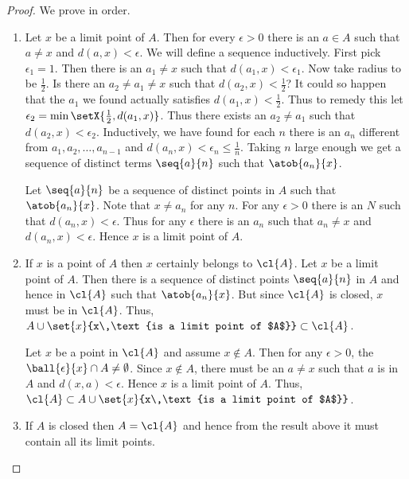 \begin{proof}
    We prove in order.
    \begin{enumerate}
	\item
	    Let $x$ be a limit point of $A$. Then for every $\epsilon > 0$ there is an $a \in A$ such that
	    $a \neq x$ and $d(a,x) < \epsilon$. We will define a sequence inductively.
	    First pick $\epsilon_1 = 1$. Then there is an $a_1 \neq x$ such that $d(a_1,x) < \epsilon_1$. Now
	    take radius to be $\frac{1}{2}$. Is there an $a_2 \neq a_1 \neq x$ such that $d(a_2,x) <
	    \frac{1}{2}$? It could so happen that the $a_1$ we found actually satisfies $d(a_1,x) <
	    \frac{1}{2}$. Thus to remedy this let $\epsilon_2 = \min\setX{\frac{1}{2},d(a_1,x)}$. Thus there
	    exists an $a_2 \neq a_1$ such that $d(a_2,x) < \epsilon_2$. Inductively, we have found for each
	    $n$ there is an $a_n$ different from $a_1,a_2,\ldots,a_{n-1}$ and $d(a_n,x) < \epsilon_n \leq
	    \frac{1}{n}$. Taking $n$ large enough we get a sequence of distinct terms $\seq{a}{n}$ such that
	    $\atob{a_n}{x}$.

	    Let $\seq{a}{n}$ be a sequence of distinct points in $A$ such that $\atob{a_n}{x}$. Note that $x
	    \neq a_n$ for any $n$. For any
	    $\epsilon > 0$ there is an $N$ such that $d(a_n,x) < \epsilon$. Thus for any $\epsilon$ there is
	    an $a_n$ such that $a_n \neq x$ and $d(a_n,x) < \epsilon$. Hence $x$ is a limit point of $A$.

	\item
	    If $x$ is a point of $A$ then $x$ certainly belongs to $\cl{A}$. Let $x$ be a limit point of $A$.
	    Then there is a sequence of distinct points $\seq{a}{n}$ in $A$ and hence in $\cl{A}$ such that
	    $\atob{a_n}{x}$. But since $\cl{A}$ is closed, $x$ must be in $\cl{A}$. Thus,
	    $A \cup \set{x}{x\,\text{is a limit point of $A$}} \subset \cl{A}$.

	    Let $x$ be a point in $\cl{A}$ and assume $x \not \in A$. Then for any $\epsilon > 0$, the
	    $\ball{\epsilon}{x}\cap A \neq \emptyset$. Since $x \not\in A$, there must be an $a \neq x$ such
	    that $a$ is in $A$ and $d(x,a) < \epsilon$. Hence $x$ is a limit point of $A$. Thus, $\cl{A}
	    \subset A \cup \set{x}{x\,\text{is a limit point of $A$}}$.

	\item
	    If $A$ is closed then $A = \cl{A}$ and hence from the result above it must contain all its limit
	    points.
    \end{enumerate}
\end{proof}

